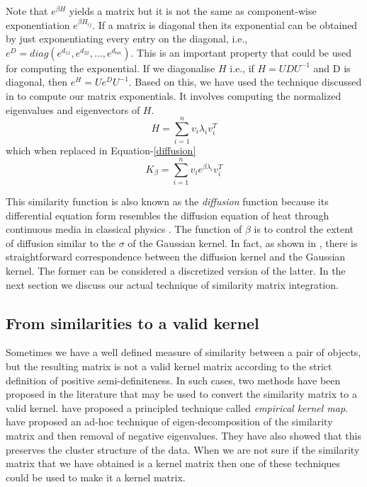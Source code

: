 Note that $e^{\beta H}$ yields a matrix but it is not the same as component-wise exponentiation $e^{\beta H_{ij}}$. If a matrix is diagonal then its exponential can be obtained by just exponentiating every entry on the diagonal, i.e., $e^{D}=diag(e^{d_{11}},e^{d_{22}},\dots,e^{d_{nn}})$. This is an important property that could be used for computing the exponential. If we diagonalise $H$ i.e., if $H = UDU^{-1}$ and D is diagonal, then $e^{H} = Ue^{D}U^{-1}$. Based on this, we have used the technique discussed in \citet{Moler2003Nineteen} to compute our matrix exponentials. It involves computing the normalized eigenvalues and eigenvectors of $H$.
\begin{equation}
    H = \sum_{i=1}^{n}v_{i}\lambda_{i}v_{i}^{T}
\end{equation}
which when replaced in Equation-\ref{diffusion}
\begin{equation}
   K_{\beta}=\sum_{i=1}^{n}v_{i}e^{\beta \lambda_{i}}v_{i}^{T}
\end{equation}

This similarity function is also known as the \textit{diffusion} function because its differential equation form resembles the diffusion equation of heat through continuous media in classical physics \citep{Kondor02diffusion}. The function of $\beta$ is to control the extent of diffusion similar to the $\sigma$ of the Gaussian kernel. In fact, as shown in \citet{kernel_methodsvert2004}, there is straightforward correspondence between the diffusion kernel and the Gaussian kernel. The former can be considered a discretized version of the latter. In the next section we discuss our actual technique of similarity matrix integration. 

\subsection{From similarities to a valid kernel}
Sometimes we have a well defined measure of similarity between a pair of objects, but the resulting matrix is not a valid kernel matrix according to the strict definition of positive semi-definiteness. In such cases, two methods have been proposed in the literature that may be used to convert the similarity matrix to a valid kernel. \citet{tsuda99supportasymmetric} have proposed a principled technique called \textit{empirical kernel map}. \citet{roth2002going} have proposed an ad-hoc technique of eigen-decomposition of the similarity matrix and then removal of negative eigenvalues. They have also showed that this preserves the cluster structure of the data. When we are not sure if the similarity matrix that we have obtained is a kernel matrix then one of these techniques could be used to make it a kernel matrix. 
